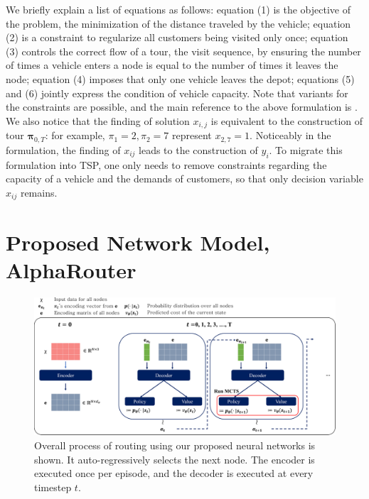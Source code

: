 \documentclass{article}
\begin{document}
We briefly explain a list of equations as follows:
equation (1) is the objective of the problem, the minimization of the distance traveled by the vehicle; equation (2) is a constraint to regularize all customers being visited only once; equation (3) controls the correct flow of a tour, the visit sequence, by ensuring the number of times a vehicle enters a node is equal to the number of times it leaves the node; equation (4) imposes that only one vehicle leaves the depot; equations (5) and (6) jointly express the condition of vehicle capacity. Note that variants for the constraints are possible, and the main reference to the above formulation is \citet{CVRPLP}. We also notice that the finding of solution $x_{i,j}$ is equivalent to the construction of tour ${\boldsymbol{\pi}_{0,T}}$: for example, $\pi_1=2, \pi_2=7$ represent $x_{2,7}=1$.
Noticeably in the formulation, the finding of $x_{ij}$ leads to the construction of $y_i$.
To migrate this formulation into TSP, one only needs to remove constraints regarding the capacity of a vehicle and the demands of customers, so that only decision variable $x_{ij}$ remains.

\section{Proposed Network Model, AlphaRouter}

\begin{figure}
    \centering
    \includegraphics[width=0.98\linewidth]{figures/overall.png}
    \caption{Overall process of routing using our proposed neural networks is shown. It auto-regressively selects the next node. The encoder is executed once per episode, and the decoder is executed at every timestep $t$.}
    \label{fig:nn-overall}
\end{figure}
\end{document}
